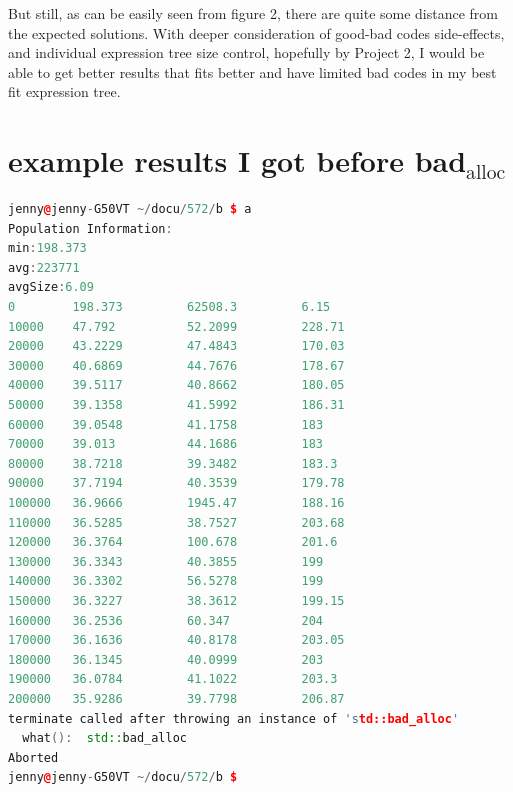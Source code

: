 \documentclass[10pt,b5paper]{article}
\begin{document}
But still, as can be easily seen from figure 2, there are quite some distance from the expected solutions. With deeper consideration of good-bad codes side-effects, and individual expression tree size control, hopefully by Project 2, I would be able to get better results that fits better and have limited bad codes in my best fit expression tree. 

\section{example results I got before bad$_{\text{alloc}}$}
\label{sec-4}
\begin{lstlisting}[language=c++]
jenny@jenny-G50VT ~/docu/572/b $ a
Population Information: 
min:198.373
avg:223771
avgSize:6.09
0        198.373         62508.3         6.15
10000    47.792          52.2099         228.71
20000    43.2229         47.4843         170.03
30000    40.6869         44.7676         178.67
40000    39.5117         40.8662         180.05
50000    39.1358         41.5992         186.31
60000    39.0548         41.1758         183
70000    39.013          44.1686         183
80000    38.7218         39.3482         183.3
90000    37.7194         40.3539         179.78
100000   36.9666         1945.47         188.16
110000   36.5285         38.7527         203.68
120000   36.3764         100.678         201.6
130000   36.3343         40.3855         199
140000   36.3302         56.5278         199
150000   36.3227         38.3612         199.15
160000   36.2536         60.347          204
170000   36.1636         40.8178         203.05
180000   36.1345         40.0999         203
190000   36.0784         41.1022         203.3
200000   35.9286         39.7798         206.87
terminate called after throwing an instance of 'std::bad_alloc'
  what():  std::bad_alloc
Aborted
jenny@jenny-G50VT ~/docu/572/b $ 
\end{lstlisting}
\end{document}
